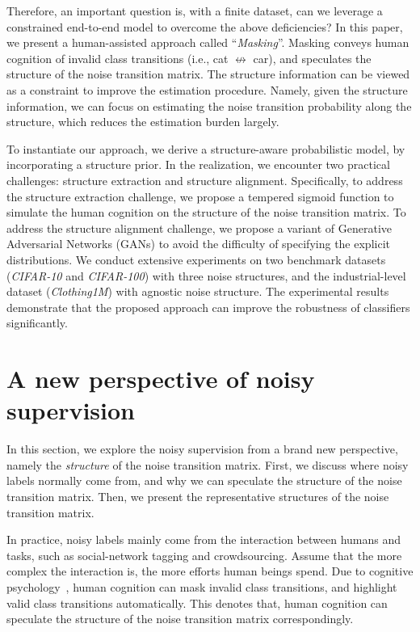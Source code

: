 \documentclass{article}
\begin{document}
Therefore, an important question is, with a finite dataset, can we leverage a constrained end-to-end model to overcome the above deficiencies? In this paper, we present a human-assisted approach called ``\textit{Masking}''. Masking conveys human cognition of invalid class transitions (i.e., cat $\nleftrightarrow$ car), and speculates the structure of the noise transition matrix. The structure information can be viewed as a constraint to improve the estimation procedure. Namely, given the structure information, we can focus on estimating the noise transition probability along the structure, which reduces the estimation burden largely.

To instantiate our approach, we derive a structure-aware probabilistic model, by incorporating a structure prior. In the realization, we encounter two practical challenges: structure extraction and structure alignment. Specifically, to address the structure extraction challenge, we propose a tempered sigmoid function to simulate the human cognition on the structure of the noise transition matrix. To address the structure alignment challenge, we propose a variant of Generative Adversarial Networks (GANs) \cite{goodfellow2014generative} to avoid the difficulty of specifying the explicit distributions. We conduct extensive experiments on two benchmark datasets (\textit{CIFAR-10} and \textit{CIFAR-100}) with three noise structures, and the industrial-level dataset (\textit{Clothing1M}\cite{xiao2015learning}) with agnostic noise structure. The experimental results demonstrate that the proposed approach can improve the robustness of classifiers significantly.

\section{A new perspective of noisy supervision}\label{new-perspective}
In this section, we explore the noisy supervision from a brand new perspective, namely the \textit{structure} of the noise transition matrix. First, we discuss where noisy labels normally come from, and why we can speculate the structure of the noise transition matrix. Then, we present the representative structures of the noise transition matrix.

In practice, noisy labels mainly come from the interaction between humans and tasks, such as social-network tagging and crowdsourcing. Assume that the more complex the interaction is, the more efforts human beings spend. Due to cognitive psychology~\cite{michalski2013machine}, human cognition can mask invalid class transitions, and highlight valid class transitions automatically. This denotes that, human cognition can speculate the structure of the noise transition matrix correspondingly.
\end{document}

